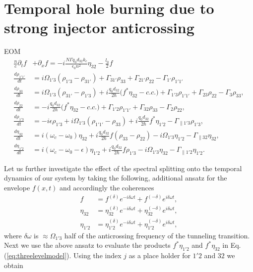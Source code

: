 \documentclass[]{spie}  %
\begin{document}
\section{Temporal hole burning due to strong injector anticrossing}
EOM
\begin{subequations}
	\label{eq:threelevelmodel}
	\begin{align}
	\frac{n}{c}\partial_t f &+ \partial_{x}f= -i\frac{N \Gamma q_0d_{32} k_c}{\epsilon_0 n^2} \eta_{32} - \frac{l_0}{2} f \label{eq:rtwave} \\
	\frac{d \rho_{1'1'}}{d t} 	&= i\Omega_{1'3} (\rho_{1'3} - \rho_{31'})+ \Gamma_{31'}\rho_{33} + \Gamma_{21'}\rho_{22}  -\Gamma_{1'}\rho_{1'1'} \\
	\frac{d \rho_{33}}{d t}	& = i\Omega_{1'3} (\rho_{31'} - \rho_{1'3}) + i\frac{q_0d_{32}}{2\hbar} \big (f^*\eta_{32}- c.c. \big ) 
	+\Gamma_{1'3}\rho_{1'1'} + \Gamma_{23}\rho_{22} - \Gamma_3 \rho_{33},  \\
	\frac{d \rho_{22}}{d t}  &= -i\frac{q_0d_{32}}{2\hbar} \big (f^*\eta_{32} - c.c. \big )  + \Gamma_{1'2}\rho_{1'1'}  +  \Gamma_{32}\rho_{33} - \Gamma_{2}\rho_{22} , \\
	\frac{d \rho_{1'3}}{d t}  &= -i\epsilon\rho_{1'3} +i \Omega_{1'3}(\rho_{1'1'} - \rho_{33}) +i\frac{q_0d_{32}}{2 \hbar}f^*\eta_{1'2}- \Gamma_{\parallel 1'3} \rho_{1'3},  \\
	\frac{d \eta_{32}}{d t}   &= i(\omega_c - \omega_0)\eta_{32} + i \frac{q_0d_{32}}{2\hbar}f(\rho_{33}-\rho_{22})  - i\Omega_{1'3}\eta_{1'2} - \Gamma_{\parallel 32}\eta_{32}, \\
	\frac{d \eta_{1'2}}{d t} &= i(\omega_c - \omega_0-\epsilon)\eta_{1'2} +i \frac{q_0d_{32}}{2\hbar}f\rho_{1'3} - i\Omega_{1'3}\eta_{32} - \Gamma_{\parallel 1'2}\eta_{1'2}.
	\end{align}
\end{subequations}
 
Let us further investigate the effect of the spectral splitting onto the temporal dynamics of our system by taking the following, additional ansatz for the envelope $f(x,t)$ and accordingly the coherences
 \begin{subequations}
 	\begin{align}
 	\label{eq:splittingAnsatz}
 	f &= f^{(\delta)}e^{- i\delta\omega t} + f^{(-\delta)}e^{i\delta\omega t}, \\
 	\eta_{32} &= \eta_{32}^{(\delta)}e^{-i\delta\omega t} + \eta_{32}^{(-\delta)}e^{i\delta\omega t}, \\
 	\eta_{1'2} &= \eta_{1'2}^{(\delta)}e^{-i\delta\omega t} + \eta_{1'2}^{(-\delta)}e^{i\delta\omega t},
 	\end{align}
 \end{subequations}
 where $\delta\omega$ is $\approx \Omega_{1'3}$ half of the anticrossing frequency of the tunneling transition. Next we use the above ansatz to evaluate the products $f^*\eta_{1'2}$ and $f^*\eta_{32}$ in Eq. (\ref{eq:threelevelmodel}). Using the index $j$ as a place holder for $1'2$ and  $32$ we obtain
\end{document}
